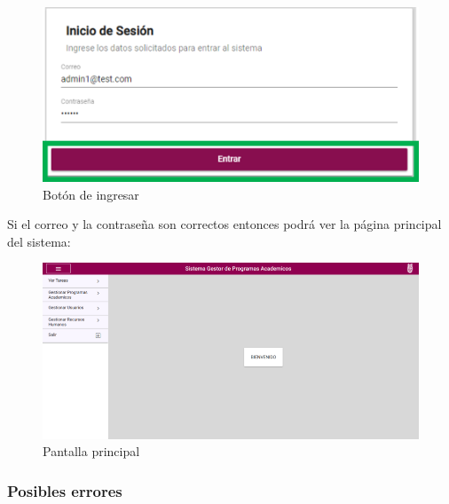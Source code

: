         \begin{figure}[!hbtp]
            \centering
            \hypertarget{BotonIng}{\includegraphics[width=0.5\linewidth]{images/SP5/BotonIngresar}}
            \caption{Botón de ingresar}
        \end{figure}

        Si el correo y la contraseña son correctos entonces podrá ver la página principal del sistema:

        \begin{figure}[!hbtp]
            \centering
            \hypertarget{Principal}{\includegraphics[width=0.7\linewidth]{images/SP5/Principal}}
            \caption{Pantalla principal}
        \end{figure}

        \clearpage
        \subsubsection{Posibles errores}


